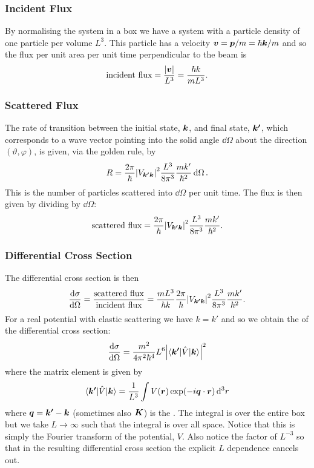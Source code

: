 \documentclass[a4paper]{article}
\renewcommand{\ket}[1]{\vert {#1} \rangle}
\renewcommand{\bra}[1]{\langle {#1} \vert}
\begin{document}
    \subsubsection{Incident Flux}
    By normalising the system in a box we have a system with a particle density of one particle per volume \(L^3\).
    This particle has a velocity \(\bm{v} = \bm{p}/m = \hbar\bm{k}/m\) and so the flux per unit area per unit time perpendicular to the beam is
    \[\text{incident flux} = \frac{\abs{\bm{v}}}{L^3} = \frac{\hbar k}{mL^3}.\]
    
    \subsubsection{Scattered Flux}
    The rate of transition between the initial state, \(\bm{k}\), and final state, \(\bm{k'}\), which corresponds to a wave vector pointing into the solid angle \(\dd{\Omega}\) about the direction \((\vartheta, \varphi)\), is given, via the golden rule, by
    \[R = \frac{2\pi}{\hbar} \abs{V_{\bm{k'}\bm{k}}}^2 \frac{L^3}{8\pi^3}\frac{mk'}{\hbar^2}\dd{\Omega}.\]
    This is the number of particles scattered into \(\dd{\Omega}\) per unit time.
    The flux is then given by dividing by \(\dd{\Omega}\):
    \[\text{scattered flux} = \frac{2\pi}{\hbar} \abs{V_{\bm{k'}\bm{k}}}^2 \frac{L^3}{8\pi^3}\frac{mk'}{\hbar^2}.\]
    
    \subsubsection{Differential Cross Section}
    The differential cross section is then
    \[\dv{\sigma}{\Omega} = \frac{\text{scattered flux}}{\text{incident flux}} = \frac{mL^3}{\hbar k}\frac{2\pi}{\hbar} \abs{V_{\bm{k'}\bm{k}}}^2 \frac{L^3}{8\pi^3} \frac{mk'}{\hbar^2}.\]
    For a real potential with elastic scattering we have \(k = k'\) and so we obtain the  of the differential cross section:
    \[\dv{\sigma}{\Omega} = \frac{m^2}{4\pi^2\hbar^4} L^6 \abs{\bra{\vv{k'}} \operator{V} \ket{\vv{k}}}^2\]
    where the matrix element is given by
    \[\bra{\vv{k'}}\operator{V}\ket{\vv{k}} = \frac{1}{L^3} \int V(\vv{r}) \exp(-i\vv{q}\cdot\vv{r}) \dd[3]{r}\]
    where \(\bm{q} = \bm{k'} - \bm{k}\) (sometimes also \(\bm{K}\)) is the .
    The integral is over the entire box but we take \(L \to \infty\) such that the integral is over all space.
    Notice that this is simply the Fourier transform of the potential, \(V\).
    Also notice the factor of \(L^{-3}\) so that in the resulting differential cross section the explicit \(L\) dependence cancels out.
    
\end{document}
